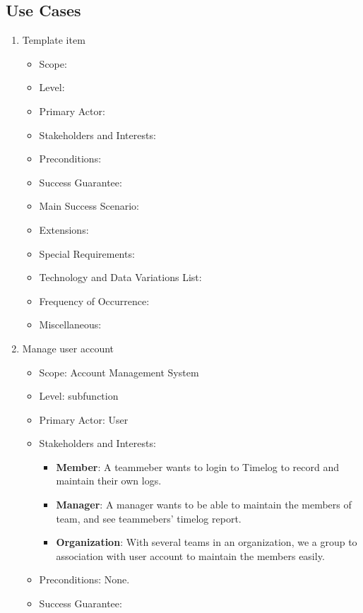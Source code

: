 \documentclass[12pt, a4paper]{article}
\begin{document}
\begin{CJK*}{UTF8}{bkai}
  \subsection{Use Cases}
    \begin{enumerate}
      \item {{Template item}}
        \begin{itemize}
          \item Scope:
          \item Level:
          \item Primary Actor:
          \item Stakeholders and Interests:
          \item Preconditions:
          \item Success Guarantee:
          \item Main Success Scenario:
          \item Extensions:
          \item Special Requirements:
          \item Technology and Data Variations List:
          \item Frequency of Occurrence:
          \item Miscellaneous:
        \end{itemize}
      \item Manage user account
        \begin{itemize}
          \item Scope: Account Management System
          \item Level: subfunction
          \item Primary Actor: User
          \item Stakeholders and Interests:
            \begin{itemize}
              \item {\bf Member}: A teammeber wants to login to Timelog to record and maintain their own logs.
              \item {\bf Manager}: A manager wants to be able to maintain the members of team, and see teammebers' timelog report.
              \item {\bf Organization}: With several teams in an organization, we a group to association with user account to maintain the members easily.
            \end{itemize}
          \item Preconditions: None.
          \item Success Guarantee:

\end{itemize}
\end{enumerate}
\end{CJK*}
\end{document}
